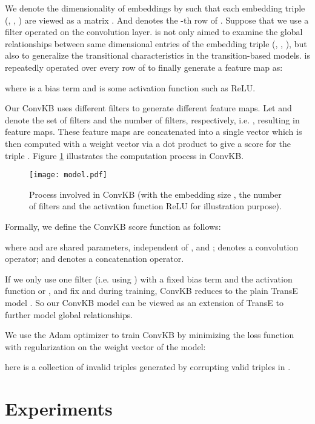 \documentclass[11pt,a4paper]{article}
\begin{document}
We denote the dimensionality of embeddings by  such that each embedding triple (, , ) are viewed as a matrix . 
And  denotes the -th row of . 
Suppose that we use a filter  operated on the convolution layer.
 is not only aimed  to examine the global relationships between same dimensional entries of the embedding triple (, , ), but also to generalize the transitional characteristics in the transition-based models.
 is repeatedly operated over every row of  to finally generate a feature map  as:

where  is a bias term and  is some   activation function such as  ReLU. 

Our ConvKB uses different filters  to generate different feature maps. 
Let  and  denote the set of filters and the number of filters, respectively, i.e. , resulting in   feature maps. 
These  feature maps are concatenated into a single vector  which is then computed with a weight vector  via a dot product to give a score for the triple . Figure \ref{fig:ConvKB} illustrates the computation process  in  ConvKB.

\begin{figure}[t]
\centering
\texttt{[image: model.pdf]}
\caption{Process involved in  ConvKB   (with the embedding size ,  the number of filters  and the  activation function  ReLU for illustration purpose).}
\label{fig:ConvKB}
\end{figure}

Formally, we define the ConvKB score function  as follows:

where  and  are shared parameters, independent of ,  and ;  denotes a convolution operator; and  denotes a concatenation operator.

If we   only use one filter  (i.e. using  ) with a fixed  bias term  and the  activation function  or , and fix  and  during training,    ConvKB reduces to the plain TransE model \citep{NIPS2013_5071}. So our  ConvKB  model can be viewed as an extension of   TransE  to further model global relationships. 

We use the Adam optimizer \citep{kingma2014adam} to train ConvKB by minimizing the loss function  \citep{Trouillon2016} with  regularization on the weight vector  of the model:


here  is a collection of invalid triples generated by corrupting valid  triples in . 



\section{Experiments}
\end{document}
